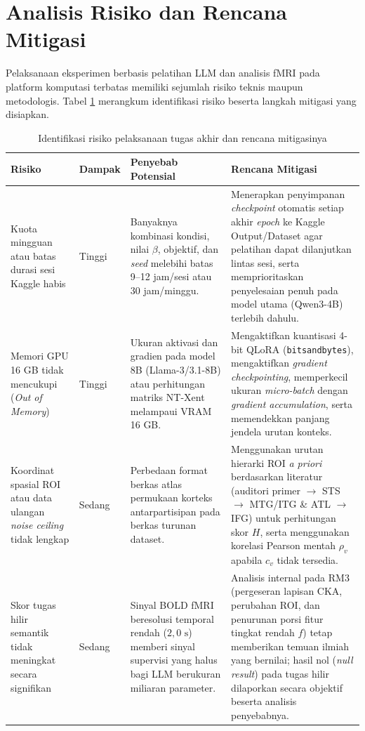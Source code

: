 \section{Analisis Risiko dan Rencana Mitigasi}
\label{sec:rs_risiko}

Pelaksanaan eksperimen berbasis pelatihan LLM dan analisis fMRI pada platform komputasi terbatas memiliki sejumlah risiko teknis maupun metodologis. Tabel \ref{tab:rs_risiko} merangkum identifikasi risiko beserta langkah mitigasi yang disiapkan.

\begin{table}[h]
  \centering
  \caption{Identifikasi risiko pelaksanaan tugas akhir dan rencana mitigasinya}
  \label{tab:rs_risiko}
  \small
  \begin{tabularx}{\textwidth}{p{2.9cm} | p{1.6cm} | p{3.6cm} | X}
    \hline
    \textbf{Risiko} & \textbf{Dampak} & \textbf{Penyebab Potensial} & \textbf{Rencana Mitigasi} \\
    \hline
    Kuota mingguan atau batas durasi sesi Kaggle habis & Tinggi & Banyaknya kombinasi kondisi, nilai $\beta$, objektif, dan \textit{seed} melebihi batas 9--12 jam/sesi atau 30 jam/minggu. & Menerapkan penyimpanan \textit{checkpoint} otomatis setiap akhir \textit{epoch} ke Kaggle Output/Dataset agar pelatihan dapat dilanjutkan lintas sesi, serta memprioritaskan penyelesaian penuh pada model utama (Qwen3-4B) terlebih dahulu. \\
    \hline
    Memori GPU 16 GB tidak mencukupi (\textit{Out of Memory}) & Tinggi & Ukuran aktivasi dan gradien pada model 8B (Llama-3/3.1-8B) atau perhitungan matriks NT-Xent melampaui VRAM 16 GB. & Mengaktifkan kuantisasi 4-bit QLoRA (\texttt{bitsandbytes}), mengaktifkan \textit{gradient checkpointing}, memperkecil ukuran \textit{micro-batch} dengan \textit{gradient accumulation}, serta memendekkan panjang jendela urutan konteks. \\
    \hline
    Koordinat spasial ROI atau data ulangan \textit{noise ceiling} tidak lengkap & Sedang & Perbedaan format berkas atlas permukaan korteks antarpartisipan pada berkas turunan dataset. & Menggunakan urutan hierarki ROI \textit{a priori} berdasarkan literatur (auditori primer $\rightarrow$ STS $\rightarrow$ MTG/ITG \& ATL $\rightarrow$ IFG) untuk perhitungan skor $H$, serta menggunakan korelasi Pearson mentah $\rho_v$ apabila $c_v$ tidak tersedia. \\
    \hline
    Skor tugas hilir semantik tidak meningkat secara signifikan & Sedang & Sinyal BOLD fMRI beresolusi temporal rendah ($2{,}0\text{ s}$) memberi sinyal supervisi yang halus bagi LLM berukuran miliaran parameter. & Analisis internal pada RM3 (pergeseran lapisan CKA, perubahan ROI, dan penurunan porsi fitur tingkat rendah $f$) tetap memberikan temuan ilmiah yang bernilai; hasil nol (\textit{null result}) pada tugas hilir dilaporkan secara objektif beserta analisis penyebabnya. \\

\end{tabularx}
\end{table}
